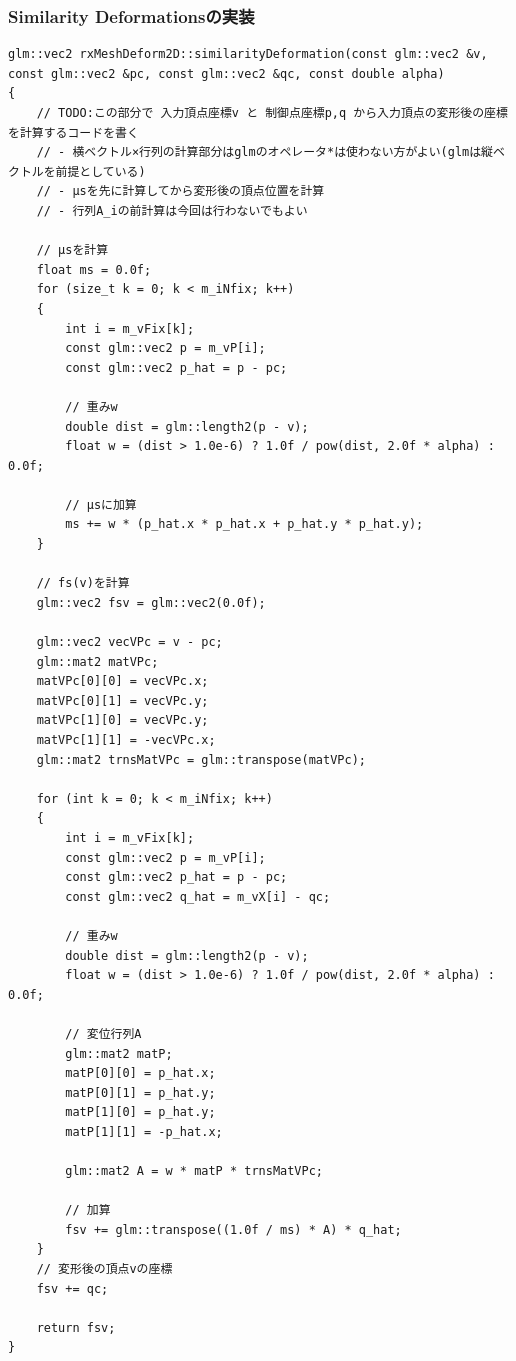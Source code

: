 \documentclass[a4paper,10pt,uplatex,dvipdfmx]{jsarticle}
\begin{document}
\subsubsection{Similarity Deformationsの実装}
\begin{lstlisting}[caption=similarityDeformation]
glm::vec2 rxMeshDeform2D::similarityDeformation(const glm::vec2 &v, const glm::vec2 &pc, const glm::vec2 &qc, const double alpha)
{
	// TODO:この部分で 入力頂点座標v と 制御点座標p,q から入力頂点の変形後の座標を計算するコードを書く
	// - 横ベクトル×行列の計算部分はglmのオペレータ*は使わない方がよい(glmは縦ベクトルを前提としている)
	// - μsを先に計算してから変形後の頂点位置を計算
	// - 行列A_iの前計算は今回は行わないでもよい

	// μsを計算
	float ms = 0.0f;
	for (size_t k = 0; k < m_iNfix; k++)
	{
		int i = m_vFix[k];
		const glm::vec2 p = m_vP[i];
		const glm::vec2 p_hat = p - pc;

		// 重みw
		double dist = glm::length2(p - v);
		float w = (dist > 1.0e-6) ? 1.0f / pow(dist, 2.0f * alpha) : 0.0f;

		// μsに加算
		ms += w * (p_hat.x * p_hat.x + p_hat.y * p_hat.y);
	}

	// fs(v)を計算
	glm::vec2 fsv = glm::vec2(0.0f);

	glm::vec2 vecVPc = v - pc;
	glm::mat2 matVPc;
	matVPc[0][0] = vecVPc.x;
	matVPc[0][1] = vecVPc.y;
	matVPc[1][0] = vecVPc.y;
	matVPc[1][1] = -vecVPc.x;
	glm::mat2 trnsMatVPc = glm::transpose(matVPc);

	for (int k = 0; k < m_iNfix; k++)
	{
		int i = m_vFix[k];
		const glm::vec2 p = m_vP[i];
		const glm::vec2 p_hat = p - pc;
		const glm::vec2 q_hat = m_vX[i] - qc;

		// 重みw
		double dist = glm::length2(p - v);
		float w = (dist > 1.0e-6) ? 1.0f / pow(dist, 2.0f * alpha) : 0.0f;

		// 変位行列A
		glm::mat2 matP;
		matP[0][0] = p_hat.x;
		matP[0][1] = p_hat.y;
		matP[1][0] = p_hat.y;
		matP[1][1] = -p_hat.x;

		glm::mat2 A = w * matP * trnsMatVPc;

		// 加算
		fsv += glm::transpose((1.0f / ms) * A) * q_hat;
	}
	// 変形後の頂点vの座標
	fsv += qc;

	return fsv;
}
\end{lstlisting}
\end{document}
